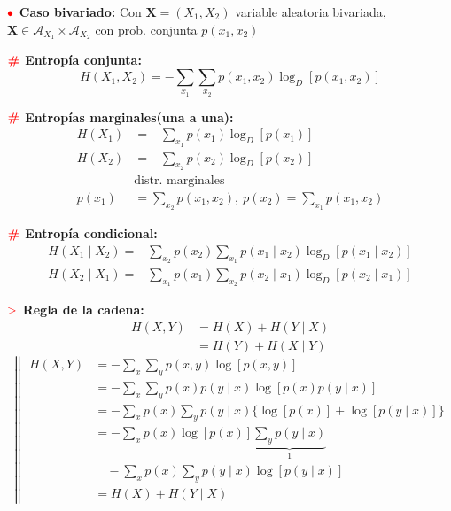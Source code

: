 \documentclass[%
 reprint,
 amsmath,amssymb,
 aps,
]{revtex4-1}
\begin{document}
\textbf{$\color{red}{\bullet}$ Caso bivariado:}
Con $\mathbf{X}=\left(X_{1}, X_{2}\right)$ variable aleatoria bivariada, $\mathbf{X} \in \mathcal{A}_{X_{1}}\times\mathcal{A}_{X_{2}}$ con prob. conjunta $p\left(x_{1}, x_{2}\right)$

\textbf{$\color{red}{\textbf{\#}}$ Entropía conjunta:}
$$
H\left(X_{1}, X_{2}\right)=-\sum_{x_{1}} \sum_{x_{2}} p\left(x_{1}, x_{2}\right) \log _{D}\left[p\left(x_{1}, x_{2}\right)\right]
$$

\textbf{$\color{red}{\textbf{\#}}$ Entropías marginales(una a una): }
$$
\begin{aligned}
H\left(X_{1}\right)&=-\sum_{x_{1}} p\left(x_{1}\right) \log _{D}\left[p\left(x_{1}\right)\right] \\
H\left(X_{2}\right)&=-\sum_{x_{2}} p\left(x_{2}\right) \log _{D}\left[p\left(x_{2}\right)\right] \\
&\text{distr. marginales } \\
p\left(x_{1}\right)&=\sum_{x_{2}} p\left(x_{1}, x_{2}\right), \
p\left(x_{2}\right)=\sum_{x_{1}} p\left(x_{1}, x_{2}\right)
\end{aligned}
$$

\textbf{$\color{red}{\textbf{\#}}$ Entropía condicional:}
$$
\begin{aligned}
H\left(X_{1} \mid X_{2}\right)=-\sum_{x_{2}} p\left(x_{2}\right) \sum_{x_{1}} p\left(x_{1} \mid x_{2}\right) \log _{D}\left[p\left(x_{1} \mid x_{2}\right)\right] \\
H\left(X_{2} \mid X_{1}\right)=-\sum_{x_{1}} p\left(x_{1}\right) \sum_{x_{2}} p\left(x_{2} \mid x_{1}\right) \log _{D}\left[p\left(x_{2} \mid x_{1}\right)\right]
\end{aligned}
$$

\textbf{$\textcolor{red}{\mathbf{>}}$ Regla de la cadena: }
$$
\begin{aligned}
  H(X, Y) &= H(X)+H(Y \mid X) \\ 
        &= H(Y)+H(X \mid Y)
\end{aligned}
$$
$$
\left\|
\begin{aligned}
H(X, Y) &=-\sum_{x} \sum_{y} p(x, y) \log [p(x, y)] \\
&=-\sum_{x} \sum_{y} p(x) p(y \mid x) \log [p(x) p(y \mid x)] \\
&=-\sum_{x} p(x) \sum_{y} p(y \mid x)\{\log [p(x)]+\log [p(y \mid x)]\} \\
&=-\sum_{x} p(x) \log [p(x)] \underbrace{\sum_{y} p(y \mid x)}_{1}  \\
& \quad  - \sum_{x} p(x) \sum_{y} p(y \mid x) \log [p(y \mid x)] \\
&=H(X)+H(Y \mid X)
\end{aligned}
\right.
$$
\end{document}
